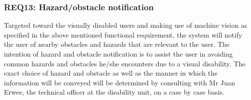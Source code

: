 		\subsubsection{REQ13: Hazard/obstacle notification}
			Targeted toward the visually disabled users and making use of machine vision as specified in the above mentioned functional requirement, the system will notify the user of nearby obstacles and hazards that are relevant to the user. The intention of hazard and obstacle notification is to assist the user in avoiding common hazards and obstacles he/she encounters due to a visual disability. The exact choice of hazard and obstacle as well as the manner in which the information will be conveyed will be determined by consulting with Mr Juan Erwee, the technical officer at the disability unit, on a case by case basis.


%			


%			

%
%	
%			
%			

